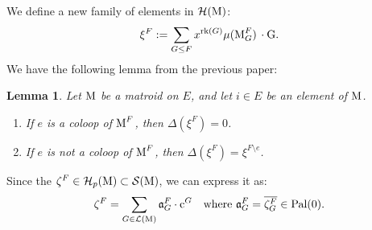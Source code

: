 \documentclass[11pt]{article}
\newcommand{\calH}{\mathcal{H}}
\newcommand{\calS}{\mathcal{S}}
\newcommand{\M}{\normalfont\text{M}}
\newcommand{\rk}{\normalfont\text{rk}}
\newcommand{\Ebasis}[1]{\mathrm{#1}}
\newcommand{\Cbasis}[1]{\mathrm{c}^{#1}}
\newcommand{\Zbasis}[1]{\zeta^{#1}}
\newcommand{\ZbasisSub}[2]{\zeta^{#1}_{#2}}
\newcommand{\pal}{\normalfont\text{Pal}}
\newcommand{\klchowcoeff}{\mathfrak{a}}
\newtheorem{lemma}[theorem]{Lemma}
\theoremstyle{remark}
\begin{document}
We define a new family of elements in \(\mathcal{H}(\M)\):
\[\xi^F := \sum_{G\le F} x^{\rk(G)}\mu(\M^F_G)\,\cdot \Ebasis{G}.\]
We have the following lemma from the previous paper:
\begin{lemma}\label{lem:deletion-xi}
    Let \(\M\) be a matroid on \(E\), and let \(i\in E\) be an element of \(\M\).
    \begin{enumerate}
        \item \label{xi-with-i-coloop}
              If \(e\) is a coloop of \(\M^F\), then \(\Delta(\xi^F) = 0\).
        \item \label{xi-with-i-noncoloop}
              If \(e\) is not a coloop of \(\M^F\), then \(\Delta(\xi^F) =
              \xi^{F\setminus e}\).
    \end{enumerate}
\end{lemma}
Since the \(\Zbasis{F}\in \calH_p(\M) \subset \calS(\M)\),
we can express it as:
\[ \Zbasis{F} = \sum_{G \in \mathcal{L}(\M)} \klchowcoeff^F_{G} \cdot \Cbasis{G}
    \quad \text{where } \klchowcoeff^F_{G} = \overline{\ZbasisSub{F}{G}} \in \pal(0). \]
\end{document}
